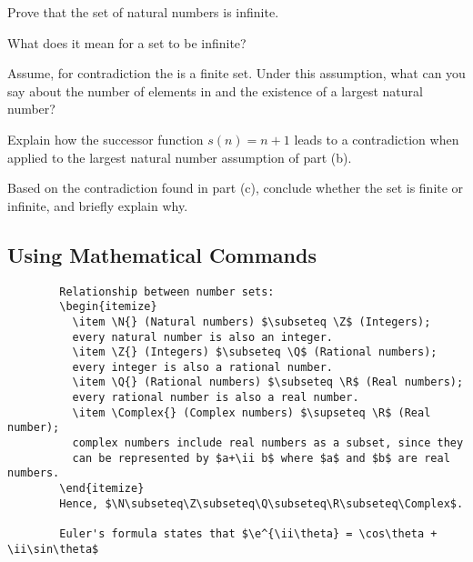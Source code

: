 \documentclass{article}
\begin{document}
\begin{center}
\begin{minipage}{0.7\textwidth}
    \begin{question}[4]
  Prove that the set \N{} of natural numbers is infinite.
  
  \qpart
    What does it mean for a set to be infinite?
    
  \qpart
    Assume, for contradiction the \N{} is a finite set. 
    Under this assumption, what can you say about the 
    number of elements in \N{} and the existence of a 
    largest natural number?
    
  \qpart
    Explain how the successor function $s(n) = n + 1$ 
    leads to a contradiction when applied to the largest 
    natural number assumption of part (b).
    
  \qpart
    Based on the contradiction found in part (c), conclude 
    whether the set \N{} is finite or infinite, and briefly 
    explain why.
\end{question}
\end{minipage}
\end{center}

\subsection{Using Mathematical Commands}

\begin{verbatim}
        Relationship between number sets:
        \begin{itemize}
          \item \N{} (Natural numbers) $\subseteq \Z$ (Integers);
          every natural number is also an integer.
          \item \Z{} (Integers) $\subseteq \Q$ (Rational numbers);
          every integer is also a rational number.
          \item \Q{} (Rational numbers) $\subseteq \R$ (Real numbers);
          every rational number is also a real number.
          \item \Complex{} (Complex numbers) $\supseteq \R$ (Real number);
          complex numbers include real numbers as a subset, since they
          can be represented by $a+\ii b$ where $a$ and $b$ are real numbers.
        \end{itemize}
        Hence, $\N\subseteq\Z\subseteq\Q\subseteq\R\subseteq\Complex$.
        
        Euler's formula states that $\e^{\ii\theta} = \cos\theta + \ii\sin\theta$
\end{verbatim}
\end{document}
